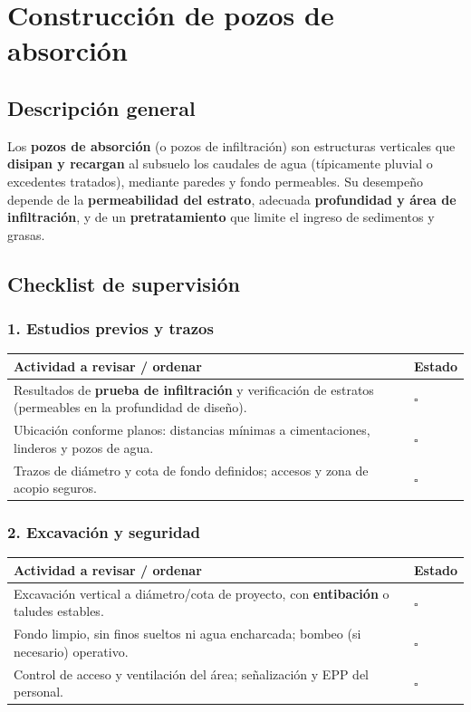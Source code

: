 \documentclass[12pt]{article}
\newcommand{\cbox}{\(\square\)} %
\begin{document}
	
	
	
	\section{Construcción de pozos de absorción}
	
	\subsection*{Descripción general}
	Los \textbf{pozos de absorción} (o pozos de infiltración) son estructuras verticales que \textbf{disipan y recargan} al subsuelo los caudales de agua (típicamente pluvial o excedentes tratados), mediante paredes y fondo permeables. Su desempeño depende de la \textbf{permeabilidad del estrato}, adecuada \textbf{profundidad y área de infiltración}, y de un \textbf{pretratamiento} que limite el ingreso de sedimentos y grasas.
	
	
	\subsection{Checklist de supervisión}
	
	\subsubsection*{1. Estudios previos y trazos}
	\begin{tabularx}{\linewidth}{>{\raggedright\arraybackslash}p{0.93\linewidth} >{\centering\arraybackslash}m{0.07\linewidth}}
		\toprule
		\textbf{Actividad a revisar / ordenar} & \textbf{Estado}\\
		\midrule
		Resultados de \textbf{prueba de infiltración} y verificación de estratos (permeables en la profundidad de diseño). & \cbox \\
		Ubicación conforme planos: distancias mínimas a cimentaciones, linderos y pozos de agua. & \cbox \\
		Trazos de diámetro y cota de fondo definidos; accesos y zona de acopio seguros. & \cbox \\
		\bottomrule
	\end{tabularx}
	
	\subsubsection*{2. Excavación y seguridad}
	\begin{tabularx}{\linewidth}{>{\raggedright\arraybackslash}p{0.93\linewidth} >{\centering\arraybackslash}m{0.07\linewidth}}
		\toprule
		\textbf{Actividad a revisar / ordenar} & \textbf{Estado}\\
		\midrule
		Excavación vertical a diámetro/cota de proyecto, con \textbf{entibación} o taludes estables. & \cbox \\
		Fondo limpio, sin finos sueltos ni agua encharcada; bombeo (si necesario) operativo. & \cbox \\
		Control de acceso y ventilación del área; señalización y EPP del personal. & \cbox \\
		\bottomrule
	\end{tabularx}
	
\end{document}
